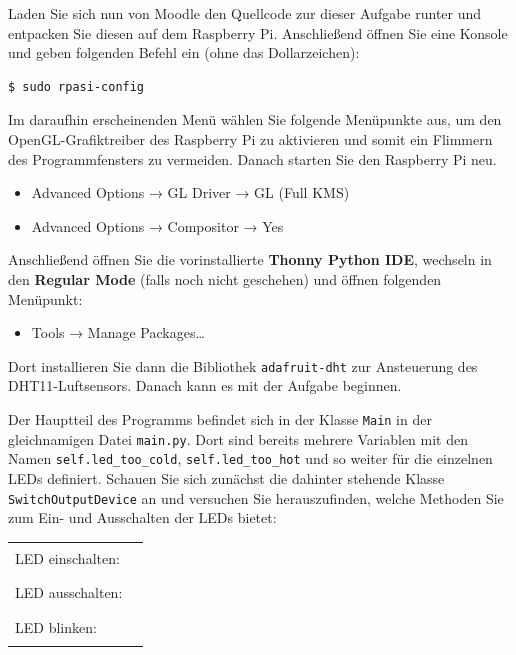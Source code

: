 \bigskip
\teilaufgabe
Laden Sie sich nun von Moodle den Quellcode zur dieser Aufgabe runter und
entpacken Sie diesen auf dem Raspberry Pi. Anschließend öffnen Sie eine Konsole
und geben folgenden Befehl ein (ohne das Dollarzeichen):

\begin{verbatim}
$ sudo rpasi-config
\end{verbatim}

Im daraufhin erscheinenden Menü wählen Sie folgende Menüpunkte aus, um den
OpenGL-Grafiktreiber des Raspberry Pi zu aktivieren und somit ein Flimmern des
Programmfensters zu vermeiden. Danach starten Sie den Raspberry Pi neu.

\begin{itemize}
    \item Advanced Options → GL Driver → GL (Full KMS)
    \item Advanced Options → Compositor → Yes
\end{itemize}

Anschließend öffnen Sie die vorinstallierte \textbf{Thonny Python IDE},
wechseln in den \textbf{Regular Mode} (falls noch nicht geschehen) und öffnen
folgenden Menüpunkt:

\begin{itemize}
    \item Tools → Manage Packages…
\end{itemize}

Dort installieren Sie dann die Bibliothek \texttt{adafruit-dht} zur Ansteuerung
des DHT11-Luftsensors. Danach kann es mit der Aufgabe beginnen.

\bigskip
\teilaufgabe
Der Hauptteil des Programms befindet sich in der Klasse \texttt{Main} in der
gleichnamigen Datei \texttt{main.py}. Dort sind bereits mehrere Variablen mit
den Namen \texttt{self\-.led\_\-too\_\-cold}, \texttt{self\-.led\_\-too\_\-hot}
und so weiter für die einzelnen LEDs definiert. Schauen Sie sich zunächst die
dahinter stehende Klasse \texttt{Switch\-Output\-Device} an und versuchen Sie
herauszufinden, welche Methoden Sie zum Ein- und Ausschalten der LEDs bietet:

{
    \renewcommand{\arraystretch}{2.5}
    \medskip

    \begin{tabular}{p{}p{}}
        LED einschalten: & \rule{20em}{1pt} \\
        LED ausschalten: & \rule{20em}{1pt} \\
        LED blinken:     & \rule{20em}{1pt} \\
    \end{tabular}

    \medskip
}

